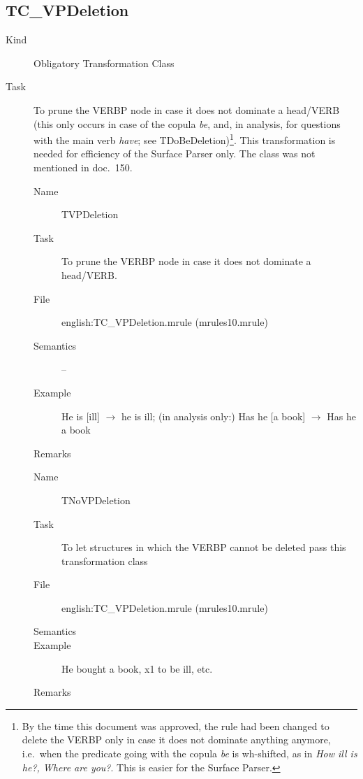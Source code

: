 \subsection{TC\_VPDeletion}
\begin{description}
\item[Kind] Obligatory Transformation Class
\item[Task] To prune the VERBP node in case it does not dominate a head/VERB 
(this only occurs in case of the copula {\em be\/}, and, in analysis, for 
questions with the main verb {\em have\/}; see TDoBeDeletion)\footnote{By the 
time this document was approved, the rule had been changed to delete the VERBP 
only in case it does not dominate anything anymore, i.e.\ when the predicate 
going with the copula {\em be \/} is wh-shifted, as in {\em How ill is he?, 
Where are you?\/}.
This is easier for the Surface Parser.}.
This transformation is needed for efficiency of the Surface Parser only. The 
class was not mentioned in doc.\ 150.

\vspace{1 cm}
\begin{description}
\item[Name] TVPDeletion
\item[Task] To prune the VERBP node in case it does not dominate a head/VERB.
\item[File] english:TC\_VPDeletion.mrule (mrules10.mrule)
\item[Semantics] --
\item[Example] He is [ill] $\rightarrow$ he is ill; (in analysis only:) Has he 
[a book] $\rightarrow$ Has he a book
\item[Remarks]
\end{description}

\vspace{1 cm}
\begin{description}
\item[Name] TNoVPDeletion
\item[Task] To let structures in which the VERBP cannot be deleted pass this 
transformation class
\item[File] english:TC\_VPDeletion.mrule (mrules10.mrule)
\item[Semantics]
\item[Example] He bought a book, x1 to be ill, etc.
\item[Remarks]
\end{description}

\end{description}

